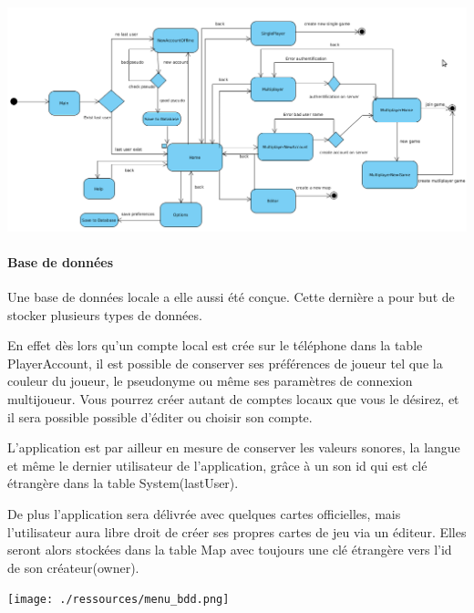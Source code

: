 \documentclass[]{report}
\begin{document}
		\begin{center}
			\label{activité}
			\includegraphics[width=23cm, angle=90]{./ressources/diag_activity.png}
		\end{center}

				\paragraph{Base de données\\}
				
				Une base de données locale a elle aussi été conçue. Cette dernière a pour
				but de stocker plusieurs types de données.
				
				En effet dès lors qu'un compte local est crée sur le téléphone dans la
				table PlayerAccount, il est possible de conserver ses préférences de joueur
				tel que la couleur du joueur, le pseudonyme ou même ses paramètres de connexion multijoueur. 
				Vous pourrez créer autant de comptes locaux que vous le désirez, et il
				sera possible possible d'éditer ou choisir son compte.
				
				L'application est par ailleur en mesure de conserver
				les valeurs sonores, la langue et même le dernier utilisateur de
				l'application, grâce à un son id qui est clé étrangère dans la table System(lastUser).
				
				De plus l'application sera délivrée avec quelques cartes officielles, mais
				l'utilisateur aura libre droit de créer ses propres cartes de jeu via un
				éditeur. Elles seront alors stockées dans la table Map avec toujours une
				clé étrangère vers l'id de son créateur(owner). \\
				
				\begin{center}
				\texttt{[image: ./ressources/menu\_bdd.png]}
				\end{center}
				
\end{document}
